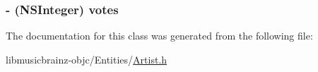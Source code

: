 \hypertarget{interface_artist_aae51dcb05865a3a2750d73eb0bf7a066}{
\subsubsection[{votes}]{\setlength{\rightskip}{0pt plus 5cm}-\/ (N\-S\-Integer) {\bf votes}}}\label{interface_artist_aae51dcb05865a3a2750d73eb0bf7a066}


The documentation for this class was generated from the following file\-:\begin{DoxyCompactItemize}
\item 
libmusicbrainz-\/objc/\-Entities/\hyperlink{_artist_8h}{Artist.\-h}\end{DoxyCompactItemize}
